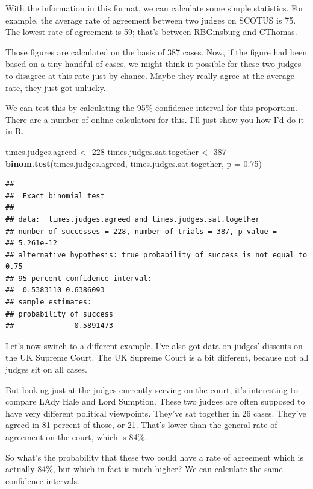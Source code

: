 \documentclass[12pt,twoside]{article}
\newenvironment{Shaded}{}{}
\newcommand{\KeywordTok}[1]{\textcolor[rgb]{0.00,0.44,0.13}{\textbf{{#1}}}}
\newcommand{\DataTypeTok}[1]{\textcolor[rgb]{0.56,0.13,0.00}{{#1}}}
\newcommand{\DecValTok}[1]{\textcolor[rgb]{0.25,0.63,0.44}{{#1}}}
\newcommand{\FloatTok}[1]{\textcolor[rgb]{0.25,0.63,0.44}{{#1}}}
\newcommand{\StringTok}[1]{\textcolor[rgb]{0.25,0.44,0.63}{{#1}}}
\newcommand{\NormalTok}[1]{{#1}}
\begin{document}
With the information in this format, we can calculate some simple
statistics. For example, the average rate of agreement between two
judges on SCOTUS is 75. The lowest rate of agreement is 59; that's
between RBGinsburg and CThomas.

Those figures are calculated on the basis of 387 cases. Now, if the
figure had been based on a tiny handful of cases, we might think it
possible for these two judges to disagree at this rate just by chance.
Maybe they really agree at the average rate, they just got unlucky.

We can test this by calculating the 95\% confidence interval for this
proportion. There are a number of online calculators for this. I'll just
show you how I'd do it in R.

\begin{Shaded}
\begin{Highlighting}[]
\NormalTok{times.judges.agreed <-}\StringTok{ }\DecValTok{228}
\NormalTok{times.judges.sat.together <-}\StringTok{ }\DecValTok{387}
\KeywordTok{binom.test}\NormalTok{(times.judges.agreed,}
           \NormalTok{times.judges.sat.together,}
           \DataTypeTok{p =} \FloatTok{0.75}\NormalTok{)}
\end{Highlighting}
\end{Shaded}

\begin{verbatim}
## 
##  Exact binomial test
## 
## data:  times.judges.agreed and times.judges.sat.together
## number of successes = 228, number of trials = 387, p-value =
## 5.261e-12
## alternative hypothesis: true probability of success is not equal to 0.75
## 95 percent confidence interval:
##  0.5383110 0.6386093
## sample estimates:
## probability of success 
##              0.5891473
\end{verbatim}

Let's now switch to a different example. I've also got data on judges'
dissents on the UK Supreme Court. The UK Supreme Court is a bit
different, because not all judges sit on all cases.

But looking just at the judges currently serving on the court, it's
interesting to compare LAdy Hale and Lord Sumption. These two judges are
often supposed to have very different political viewpoints. They've sat
together in 26 cases. They've agreed in 81 percent of those, or 21.
That's lower than the general rate of agreement on the court, which is
84\%.

So what's the probability that these two could have a rate of agreement
which is actually 84\%, but which in fact is much higher? We can
calculate the same confidence intervals.
\end{document}
